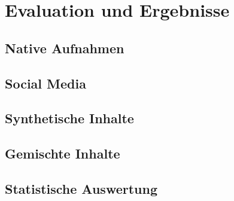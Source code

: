 \chapter{Evaluation und Ergebnisse}

\section{Native Aufnahmen}
\section{Social Media}
\section{Synthetische Inhalte}
\section{Gemischte Inhalte}
\section{Statistische Auswertung}
